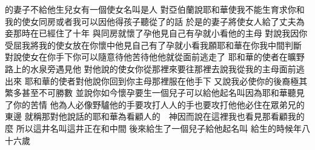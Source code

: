 \bchapter%
的妻子不給他生兒女\yuentien{}有一個使女名叫\chientien 是人\chuan 
{}對{亞伯\allowbreak 蘭}說\chientien 耶和華使我不能生育\chientien 求你和我的使女同房\chientien 或者我可以因他得孩子\chuan{}聽從了的話\yuentien 
{}於是的妻子\chientien 將使女人給了丈夫為妾\yuentien 那時在已經住了十年\chuan 
{}與同房\chientien{}就懷了孕\yuentien 他見自己有孕\chientien 就小看他的主母\chuan 
{}對說\chientien 我因你受屈\chientien 我將我的使女放在你懷中\chientien 他見自己有了孕就小看我\chientien 願耶和華在你我中間判斷\chuan 
{}對說\chientien 使女在你手下\chientien 你可以隨意待他\yuentien{}苦待他\chientien 他就從面前逃走了\chuan\Chuan
{}耶和華的使者在曠野\chientien{}路上的水泉旁遇見他\chientien 
{}對他說\chientien{}的使女\chientien 你從那裡來\chientien 要往那裡去\yuentien{}說\chientien 我從我的主母面前逃出來\chuan 
{}耶和華的使者對他說\chientien 你回到你主母那裡\chientien 服在他手下\chuan 
{}又說\chientien 我必使你的後裔極其繁多\chientien 甚至不可勝數\chuan 
{}並說\chientien 你如今懷孕要生一個兒子\chientien 可以給他起名叫\chientien 因為耶和華聽見了你的苦情\chuan{}
他為人必像野驢\yuentien 他的手要攻打人\chientien 人的手也要攻打他\chientien 他必住在眾弟兄的東邊\chuan 
{}就稱那對他說話的耶和華為看顧人的　神\yuentien 因而說\chientien 在這裡我也看見那看顧我的麼\chuan 
{}所以這井名叫\yuentien 這井正在\chientien 和中間\chuan\Chuan
{}後來給生了一個兒子\yuentien{}給他起名叫\chuan 
{}給生的時候\chientien{}年八十六歲\chuan 
